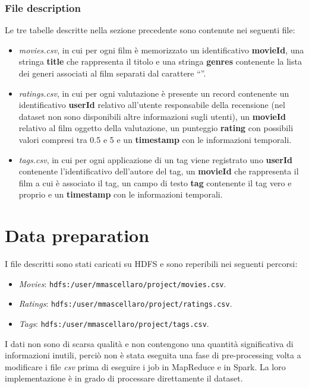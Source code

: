\documentclass[10pt]{article}
\begin{document}
\subsubsection{File description}

Le tre tabelle descritte nella sezione precedente sono contenute nei seguenti file:

\begin{itemize}
\item \textit{movies.csv}, in cui per ogni film è memorizzato un identificativo \textbf{movieId}, una stringa \textbf{title} che rappresenta il titolo e una stringa \textbf{genres} contenente la lista dei generi associati al film separati dal carattere ``\textbar''.
\item \textit{ratings.csv}, in cui per ogni valutazione è presente un record contenente un identificativo \textbf{userId} relativo all'utente responsabile della recensione (nel dataset non sono disponibili altre informazioni sugli utenti), un \textbf{movieId} relativo al film oggetto della valutazione, un punteggio \textbf{rating} con possibili valori compresi tra 0.5 e 5 e un \textbf{timestamp} con le informazioni temporali.
\item \textit{tags.csv}, in cui per ogni applicazione di un tag viene registrato uno \textbf{userId} contenente l'identificativo dell'autore del tag, un \textbf{movieId} che rappresenta il film a cui è associato il tag, un campo di testo \textbf{tag} contenente il tag vero e proprio e un \textbf{timestamp} con le informazioni temporali.
\end{itemize}

\section{Data preparation}

I file descritti sono stati caricati su HDFS e sono reperibili nei seguenti percorsi:

\begin{itemize}
\item \textit{Movies}: \texttt{hdfs:/user/mmascellaro/project/movies.csv}.
\item \textit{Ratings}: \texttt{hdfs:/user/mmascellaro/project/ratings.csv}.
\item \textit{Tags}: \texttt{hdfs:/user/mmascellaro/project/tags.csv}.
\end{itemize}

I dati non sono di scarsa qualità e non contengono una quantità significativa di informazioni inutili, perciò non è stata eseguita una fase di pre-processing volta a modificare i file \textit{csv} prima di eseguire i job in MapReduce e in Spark. La loro implementazione è in grado di processare direttamente il dataset.
\end{document}
